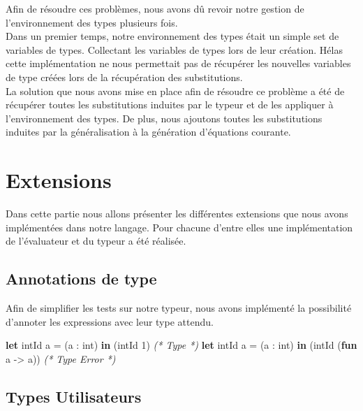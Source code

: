 \documentclass[
  12pt,
]{article}
\newenvironment{Shaded}{}{}
\newcommand{\CommentTok}[1]{\textcolor[rgb]{0.38,0.63,0.69}{\textit{#1}}}
\newcommand{\DataTypeTok}[1]{\textcolor[rgb]{0.56,0.13,0.00}{#1}}
\newcommand{\DecValTok}[1]{\textcolor[rgb]{0.25,0.63,0.44}{#1}}
\newcommand{\KeywordTok}[1]{\textcolor[rgb]{0.00,0.44,0.13}{\textbf{#1}}}
\newcommand{\NormalTok}[1]{#1}
\begin{document}
Afin de résoudre ces problèmes, nous avons dû revoir notre gestion de
l'environnement des types plusieurs fois.\\

Dans un premier temps, notre environnement des types était un simple set
de variables de types. Collectant les variables de types lors de leur
création. Hélas cette implémentation ne nous permettait pas de récupérer
les nouvelles variables de type créées lors de la récupération des
substitutions.\\

La solution que nous avons mise en place afin de résoudre ce problème a
été de récupérer toutes les substitutions induites par le typeur et de
les appliquer à l'environnement des types. De plus, nous ajoutons toutes
les substitutions induites par la généralisation à la génération
d'équations courante.

\pagebreak

\section{Extensions}\label{extensions}

Dans cette partie nous allons présenter les différentes extensions que
nous avons implémentées dans notre langage. Pour chacune d'entre elles
une implémentation de l'évaluateur et du typeur a été réalisée.

\subsection{Annotations de type}\label{annotations-de-type}

Afin de simplifier les tests sur notre typeur, nous avons implémenté la
possibilité d'annoter les expressions avec leur type attendu.\\

\begin{Shaded}
\begin{Highlighting}[]
\KeywordTok{let}\NormalTok{ intId a = (a : }\DataTypeTok{int}\NormalTok{) }\KeywordTok{in}\NormalTok{ (intId }\DecValTok{1}\NormalTok{) }\CommentTok{(* Type *)}
\KeywordTok{let}\NormalTok{ intId a = (a : }\DataTypeTok{int}\NormalTok{) }\KeywordTok{in}\NormalTok{ (intId (}\KeywordTok{fun}\NormalTok{ a {-}\textgreater{} a)) }\CommentTok{(* Type Error *)}
\end{Highlighting}
\end{Shaded}

\subsection{Types Utilisateurs}\label{types-utilisateurs}
\end{document}
